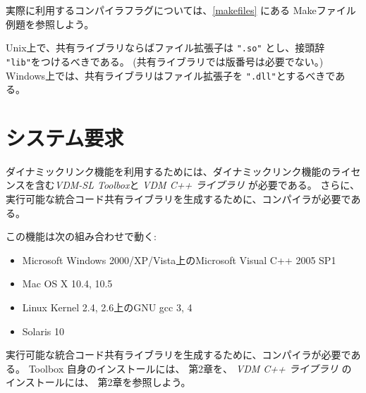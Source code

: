 \documentclass[\pformat,12pt]{jarticle}
\begin{document}
実際に利用するコンパイラフラグについては、\ref{makefiles} にある Makeファイル例題を参照しよう。

Unix上で、共有ライブラリならばファイル拡張子は {\tt ".so"} とし、接頭辞 {\tt "lib"}をつけるべきである。
(共有ライブラリでは版番号は必要でない。) 
 Windows上では、共有ライブラリはファイル拡張子を \texttt{".dll"}とするべきである。

\newpage


\newpage
\appendix

\section{システム要求}
\label{sec:sysreq}

ダイナミックリンク機能を利用するためには、ダイナミックリンク機能のライセンスを含む{\it VDM-SL Toolbox}と {\it VDM C++ ライブラリ} が必要である。
さらに、実行可能な統合コード共有ライブラリを生成するために、コンパイラが必要である。

この機能は次の組み合わせで動く:
\begin{itemize}
\item Microsoft Windows 2000/XP/Vista上のMicrosoft Visual C++ 2005 SP1
\item Mac OS X 10.4, 10.5
\item Linux Kernel 2.4, 2.6上のGNU gcc 3, 4
\item Solaris 10
\end{itemize}

実行可能な統合コード共有ライブラリを生成するために、コンパイラが必要である。 
Toolbox 自身のインストールには、 \cite{UserMan-CSK}第2章を、 {\it VDM C++ ライブラリ} のインストールには、 \cite{CGMan-CSK}第2章を参照しよう。
\end{document}
